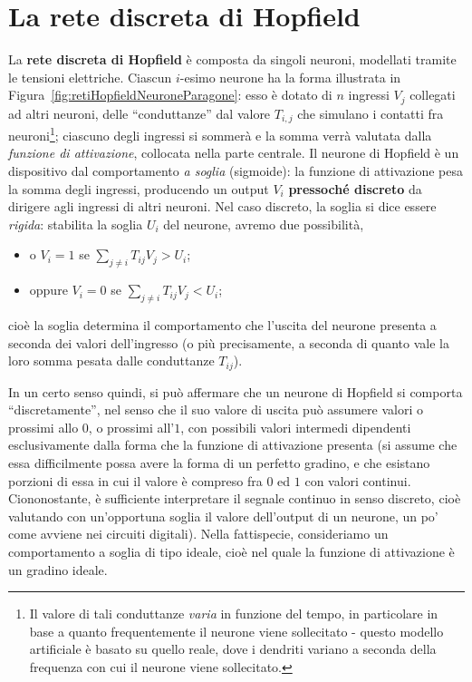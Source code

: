 \documentclass[10pt]{book}
\begin{document}
\section{La rete discreta di Hopfield}

La \textbf{rete discreta di Hopfield} è composta da singoli neuroni, modellati tramite
le tensioni elettriche. Ciascun $i$-esimo neurone ha la forma illustrata in
Figura~\ref{fig:retiHopfieldNeuroneParagone}: esso è dotato di $n$ ingressi
$V_j$ collegati ad altri neuroni, delle ``conduttanze'' dal valore $T_{i,j}$
che simulano i contatti fra neuroni\footnote{Il valore di tali conduttanze
\emph{varia} in funzione del tempo, in particolare in base a quanto
frequentemente il neurone viene sollecitato \-- questo modello artificiale è
basato su quello reale, dove i dendriti variano a seconda della frequenza con
cui il neurone viene sollecitato.}; ciascuno degli ingressi si sommerà e la
somma verrà valutata dalla \emph{funzione di attivazione}, collocata nella
parte centrale. Il neurone di Hopfield è un dispositivo dal comportamento
\emph{a soglia} (sigmoide): la funzione di attivazione pesa la somma degli
ingressi, producendo un output $V_{i}$ \textbf{pressoché discreto} da dirigere
agli ingressi di altri neuroni. Nel caso discreto, la soglia si dice essere
\emph{rigida}: stabilita la soglia $U_i$ del neurone, avremo due possibilità,
\begin{itemize}
    \item o $V_{i} = 1$ se $\sum_{j\neq i} T_{ij} V_j > U_i$;
    \item oppure $V_{i} = 0$ se $\sum_{j\neq i} T_{ij} V_j < U_i$;
\end{itemize}

cioè la soglia determina il comportamento che l'uscita del neurone presenta a
seconda dei valori dell'ingresso (o più precisamente, a seconda di quanto vale
la loro somma pesata dalle conduttanze $T_{ij}$).

In un certo senso quindi, si può affermare che un neurone di Hopfield si
comporta ``discretamente'', nel senso che il suo valore di uscita può assumere
valori o prossimi allo $0$, o prossimi all'$1$, con possibili valori intermedi
dipendenti esclusivamente dalla forma che la funzione di attivazione presenta
(si assume che essa difficilmente possa avere la forma di un perfetto gradino,
e che esistano porzioni di essa in cui il valore è compreso fra $0$ ed $1$ con
valori continui. Ciononostante, è sufficiente interpretare il segnale continuo
in senso discreto, cioè valutando con un'opportuna soglia il valore dell'output
di un neurone, un po' come avviene nei circuiti digitali). Nella fattispecie,
consideriamo un comportamento a soglia di tipo ideale, cioè nel quale la
funzione di attivazione è un gradino ideale.
\end{document}
